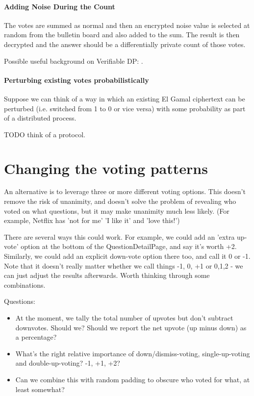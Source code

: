 \documentclass[10pt,a4paper]{article}
\begin{document}
\paragraph{Adding Noise During the Count}

The votes are summed as normal and then an encrypted noise value is selected at random from the bulletin board and also added to the sum. The result is then decrypted and the answer should be a differentially private count of those votes.

Possible useful background on Verifiable DP: \cite{narayan2015verifiable,kato2021preventing}.

\paragraph{Perturbing existing votes probabilistically}

Suppose we can think of a way in which an existing El Gamal ciphertext can be perturbed (i.e. switched from 1 to 0 or vice versa) with some probability as part of a distributed process.

TODO think of a protocol.

\section{Changing the voting patterns}	 \label{sec:complexVoting}
An alternative is to leverage three or more different voting options. This doesn't remove the risk of unanimity, and doesn't solve the problem of revealing who voted on what questions, but it may make unanimity much less likely. (For example, Netflix has 'not for me' 'I like it' and 'love this!')

There are several ways this could work. For example, we could add an 'extra up-vote' option at the bottom of the QuestionDetailPage, and say it's worth +2. Similarly, we could add an explicit down-vote option there too, and call it 0 or -1.
Note that it doesn't really matter whether we call things -1, 0, +1 or 0,1,2 - we can just adjust the results afterwards. Worth thinking through some combinations.

Questions:
\begin{itemize}
	\item At the moment, we tally the total number of upvotes but don't subtract downvotes. Should we? Should we report the net upvote (up minus down) as a percentage? 
	\item What's the right relative importance of down/dismiss-voting, single-up-voting and double-up-voting? -1, +1, +2?
	\item Can we combine this with random padding to obscure who voted for what, at least somewhat?
\end{itemize}
\end{document}
